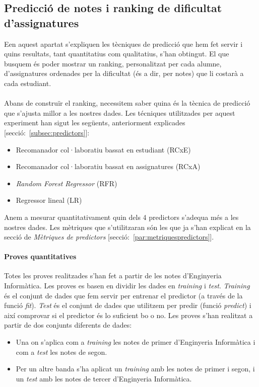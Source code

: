 \documentclass[12pt,a4paper,catalan]{article}
\begin{document}
\newpage

\subsection{Predicció de notes i ranking de dificultat d'assignatures}
Een aquest apartat s'expliquen  les tècniques de predicció que hem fet servir i quins resultats, tant quantitatius com qualitatius, s'han obtingut. El que busquem és poder mostrar un ranking, personalitzat per cada alumne, d'assignatures ordenades per la dificultat (és a dir, per notes) que li costarà a cada estudiant.
\\
\\
Abans de construïr el ranking, necessitem saber quina és la tècnica de predicció que s'ajusta millor a les nostres dades. Les técniques utilitzades per aquest experiment han sigut les següents, anteriorment explicades [secció:~\ref{subsec:predictors}]:

\begin{itemize}[leftmargin=.5in]
	\item Recomanador col·laboratiu bassat en estudiant (RCxE)
	\item Recomanador col·laboratiu bassat en assignatures (RCxA)
	\item \textit{Random Forest Regressor} (RFR)
	\item Regressor lineal (LR)
\end{itemize}

Anem a mesurar quantitativament quin dels 4 predictors s'adequa més a les nostres dades. Les mètriques que s'utilitzaran són les que ja s'han explicat en la secció de \textit{Mètriques de predictors} [secció:~\ref{par:metriquespredictors}].

\paragraph{Proves quantitatives}
Totes les proves realitzades s'han fet a partir de les notes d'Enginyeria Informàtica. Les proves es basen en dividir les dades en \textit{training} i \textit{test}. \textit{Training} és el conjunt de dades que fem servir per entrenar el predictor (a través de la funció \textit{fit}). \textit{Test} és el conjunt de dades que utilitzem per predir (funció \textit{predict}) i així comprovar si el predictor és lo suficient bo o no. Les proves s'han realitzat a partir de dos conjunts diferents de dades:

\begin{itemize}[leftmargin=.5in]
	\item Una on s'aplica com a \textit{training} les notes de primer d'Enginyeria Informàtica i com a \textit{test} les notes de segon.
	\item Per un altre banda s'ha aplicat un \textit{training} amb les notes de primer i segon, i un \textit{test} amb les notes de tercer d'Enginyeria Informàtica.
\end{itemize}
\end{document}
